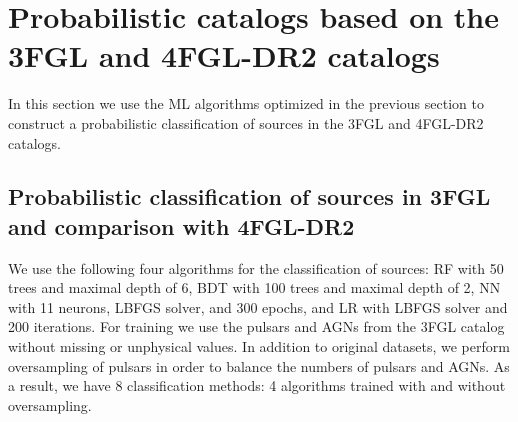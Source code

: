 \documentclass{aa}
\newcommand{\lb}{\label}
\begin{document}
\section{Probabilistic catalogs based on the 3FGL and 4FGL-DR2 catalogs}
\lb{sec:prob_cats}

In this section we use the ML algorithms optimized in the previous section to construct a probabilistic
classification of sources in the 3FGL and 4FGL-DR2 catalogs.



\subsection{Probabilistic classification of sources in 3FGL and comparison with 4FGL-DR2}
\lb{sec:3FGLprediction1}


We use the following four algorithms for the classification of sources: RF with 50 trees and maximal depth of 6, BDT with 100 trees and maximal depth of 2, NN with 11 neurons, LBFGS solver, and 300 epochs, and LR with LBFGS solver and 200 iterations. 
For training we use the pulsars and AGNs from the 3FGL catalog without missing or unphysical values. 
In addition to original datasets, we perform oversampling of pulsars in order to balance the numbers of pulsars and AGNs.
As a result, we have 8 classification methods: 4 algorithms trained with and without oversampling.
\end{document}
